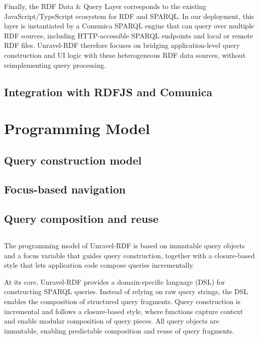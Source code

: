 \documentclass[
]{ceurart}
\begin{document}
Finally, the RDF Data \& Query Layer corresponds to the existing
JavaScript/TypeScript ecosystem for RDF and SPARQL. In our deployment,
this layer is instantiated by a Comunica SPARQL engine that can query
over multiple RDF sources, including HTTP-accessible SPARQL endpoints
and local or remote RDF files. Unravel-RDF therefore focuses on bridging
application-level query construction and UI logic with these
heterogeneous RDF data sources, without reimplementing query processing.

\subsection{Integration with RDFJS and Comunica}




\section{Programming Model}

\subsection{Query construction model}
\subsection{Focus-based navigation}
\subsection{Query composition and reuse}
\subsection{}

The programming model of Unravel-RDF is based on immutable query
objects and a focus variable that guides query construction, together
with a closure-based style that lets application code compose queries
incrementally.

At its core, Unravel-RDF provides a domain-specific language (DSL) for
constructing SPARQL queries. Instead of relying on raw query strings,
the DSL enables the composition of structured query fragments. Query
construction is incremental and follows a closure-based style, where
functions capture context and enable modular composition of query
pieces. All query objects are immutable, enabling predictable composition and
reuse of query fragments.
\end{document}
